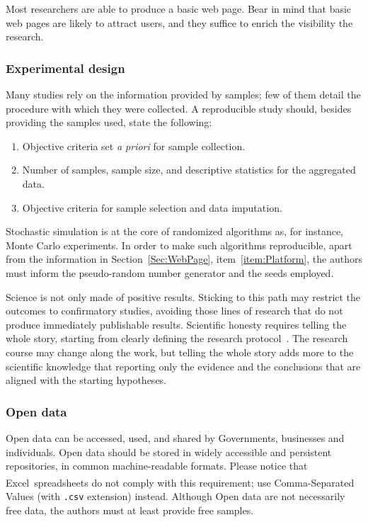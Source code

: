 \documentclass[journal,twoside]{IEEEtran}
\begin{document}
Most researchers are able to produce a basic web page. 
Bear in mind that basic web pages are likely to attract users, and they suffice to enrich the visibility the research.

\subsubsection{Experimental design} Many studies rely on the information provided by samples;
few of them detail the procedure with which they were collected.
A reproducible study should, besides providing the samples used, state the following:
\begin{enumerate}
	\item Objective criteria set \textit{a priori} for sample collection.
	\item Number of samples, sample size, and descriptive statistics for the aggregated data.
	\item Objective criteria for sample selection and data imputation.
\end{enumerate}

Stochastic simulation is at the core of randomized algorithms as, for instance, Monte Carlo experiments.
In order to make such algorithms reproducible, apart from the information in Section~\ref{Sec:WebPage}, item~\ref{item:Platform}, the authors must inform the pseudo-random number generator and the seeds employed.

Science is not only made of positive results.
Sticking to this path may restrict the outcomes to confirmatory studies, avoiding those lines of research that do not produce immediately publishable results.
Scientific honesty requires telling the whole story, starting from clearly defining the research protocol~\cite{TellItlikeItIs}.
The research course may change along the work, but telling the whole story adds more to the scientific knowledge that reporting only the evidence and the conclusions that are aligned with the starting hypotheses.


\subsubsection{Open data} Open data can be accessed, used, and shared by Governments, businesses and individuals. 
Open data should be stored in widely accessible and persistent repositories, in common machine-readable formats.
Please notice that Excel\textsuperscript{\textcopyright}\ spreadsheets do not comply with this requirement; use Comma-Separated Values (with \verb|.csv| extension) instead.
Although Open data are not necessarily free data, the authors must at least provide free samples.
\end{document}
